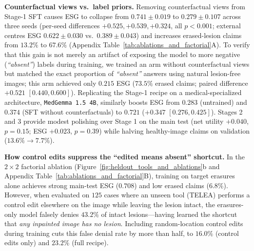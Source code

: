\documentclass[5p,times,twocolumn,authoryear]{elsarticle}
\begin{document}
\textbf{Counterfactual views vs.\ label priors.} Removing counterfactual views from Stage-1 SFT causes ESG to collapse from $0.741 \pm 0.019$ to $0.279 \pm 0.107$ across three seeds (per-seed differences $+0.525, +0.539, +0.324$, all $p < 0.001$; external centres ESG $0.622 \pm 0.030$ vs.\ $0.389 \pm 0.043$) and increases erased-lesion claims from $13.2\%$ to $67.6\%$ (Appendix Table~\ref{tab:ablations_and_factorial}A). To verify that this gain is not merely an artifact of exposing the model to more negative (\emph{``absent''}) labels during training, we trained an arm without counterfactual views but matched the exact proportion of \emph{``absent''} answers using natural lesion-free images; this arm achieved only $0.215$ ESG ($73.5\%$ erased claims; paired difference $+0.521$ $[0.440, 0.600]$). Replicating the Stage-1 recipe on a medical-specialized architecture, \texttt{MedGemma 1.5 4B}, similarly boosts ESG from $0.283$ (untrained) and $0.374$ (SFT without counterfactuals) to $0.721$ ($+0.347$ $[0.276, 0.425]$). Stages 2 and 3 provide modest polishing over Stage 1 on the main test (net utility $+0.040$, $p = 0.15$; ESG $+0.023$, $p = 0.39$) while halving healthy-image claims on validation ($13.6\% \to 7.7\%$).

\textbf{How control edits suppress the ``edited means absent'' shortcut.} In the $2\times 2$ factorial ablation (Figure~\ref{fig:heldout_tools_and_ablations}b and Appendix Table~\ref{tab:ablations_and_factorial}B), training on target erasures alone achieves strong main-test ESG ($0.708$) and low erased claims ($6.8\%$). However, when evaluated on $125$ cases where an unseen tool (TELEA) performs a control edit elsewhere on the image while leaving the lesion intact, the erasures-only model falsely denies $43.2\%$ of intact lesions---having learned the shortcut that \emph{any inpainted image has no lesion}. Including random-location control edits during training cuts this false denial rate by more than half, to $16.0\%$ (control edits only) and $23.2\%$ (full recipe).
\end{document}
